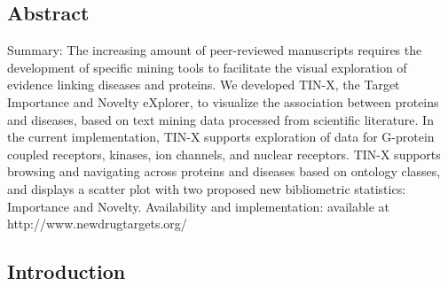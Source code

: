 \subsection{Abstract}

Summary: The increasing amount of peer-reviewed manuscripts requires the development of specific mining tools to facilitate the visual exploration of evidence linking diseases and proteins. We developed TIN-X, the Target Importance and Novelty eXplorer, to visualize the association between proteins and diseases, based on text mining data processed from scientific literature. In the current implementation, TIN-X supports exploration of data for G-protein coupled receptors, kinases, ion channels, and nuclear receptors. TIN-X supports browsing and navigating across proteins and diseases based on ontology classes, and displays a scatter plot with two proposed new bibliometric statistics: Importance and Novelty. 
Availability  and implementation:  available at http://www.newdrugtargets.org/

\subsection{Introduction}

